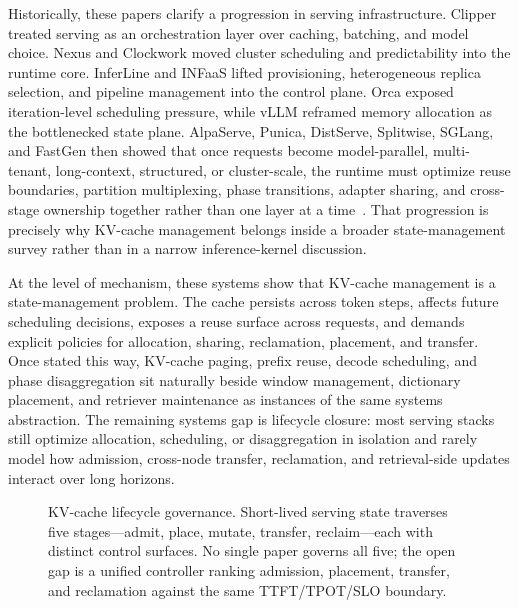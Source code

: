 \documentclass[acmsmall,screen,review]{acmart}
\begin{document}
Historically, these papers clarify a progression in serving infrastructure. Clipper treated serving as an orchestration layer over caching, batching, and model choice. Nexus and Clockwork moved cluster scheduling and predictability into the runtime core. InferLine and INFaaS lifted provisioning, heterogeneous replica selection, and pipeline management into the control plane. Orca exposed iteration-level scheduling pressure, while vLLM reframed memory allocation as the bottlenecked state plane. AlpaServe, Punica, DistServe, Splitwise, SGLang, and FastGen then showed that once requests become model-parallel, multi-tenant, long-context, structured, or cluster-scale, the runtime must optimize reuse boundaries, partition multiplexing, phase transitions, adapter sharing, and cross-stage ownership together rather than one layer at a time~\cite{crankshaw2017clipper,shen2019nexus,gujarati2020clockwork,crankshaw2020inferline,romero2021infaas,yu2022orca,kwon2023pagedattention,li2023alpaserve,chen2024punica,zhong2024distserve,patel2024splitwise,zheng2023sglang,holmes2024fastgen}. That progression is precisely why KV-cache management belongs inside a broader state-management survey rather than in a narrow inference-kernel discussion.

At the level of mechanism, these systems show that KV-cache management is a state-management problem. The cache persists across token steps, affects future scheduling decisions, exposes a reuse surface across requests, and demands explicit policies for allocation, sharing, reclamation, placement, and transfer. Once stated this way, KV-cache paging, prefix reuse, decode scheduling, and phase disaggregation sit naturally beside window management, dictionary placement, and retriever maintenance as instances of the same systems abstraction. The remaining systems gap is lifecycle closure: most serving stacks still optimize allocation, scheduling, or disaggregation in isolation and rarely model how admission, cross-node transfer, reclamation, and retrieval-side updates interact over long horizons.

\begin{figure}[t]
\centering
\resizebox{0.96\textwidth}{!}{}
\caption{KV-cache lifecycle governance. Short-lived serving state traverses five stages---admit, place, mutate, transfer, reclaim---each with distinct control surfaces. No single paper governs all five; the open gap is a unified controller ranking admission, placement, transfer, and reclamation against the same TTFT/TPOT/SLO boundary.}
\label{fig:kvcache-lifecycle}
\end{figure}
\end{document}
